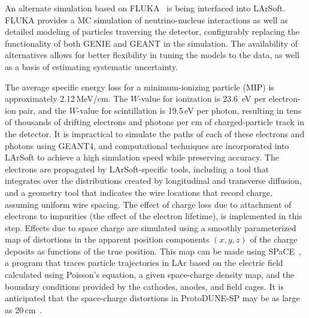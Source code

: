An alternate simulation based on FLUKA~\cite{Fluka15, Ferrari:2005zk, Battistoni:2009zzb} 
is being interfaced into LArSoft.
FLUKA provides a MC simulation of neutrino-nucleus interactions as well as
detailed modeling of particles traversing the detector, configurably replacing the
functionality of both GENIE and GEANT in the simulation.  The availability of alternatives
allows for better flexibility in tuning the models to the data, as well as a basis of
estimating systematic uncertainty.

The average specific energy loss for a minimum-ionizing particle (MIP)
is approximately 2.12\,MeV/cm.  The $W$-value for ionization is 23.6~eV
per electron-ion pair, and the $W$-value for scintillation is 19.5\,eV
per photon, resulting in tens of thousands of drifting electrons and
photons per cm of charged-particle track in the detector.  It is
impractical to simulate the paths of each of these electrons and 
photons using GEANT4, and  computational techniques are incorporated
into LArSoft to achieve a high simulation speed while preserving
accuracy.  The electrons are propagated by LArSoft-specific tools,
including a tool that integrates over the distributions created by longitudinal
and transverse diffusion, 
and a geometry tool that indicates the wire locations that record charge, assuming uniform wire spacing.
The effect of charge loss due to attachment
of electrons to impurities (the effect of the electron lifetime),   is
implemented in this step.  
Effects due to space charge are simulated using a smoothly parameterized
map of
distortions in the apparent position components $(x,y,z)$ of the charge
deposits as
functions of the true position.
This map can be made using SPaCE~\cite{Mooney:2015kke}, a
program that traces particle trajectories in LAr based on the
electric field calculated using Poisson's equation, a given
space-charge density map, and the boundary conditions provided by the
cathodes, anodes, and field cages.  It is anticipated that the
space-charge distortions in ProtoDUNE-SP may be as large as
20\,cm~\cite{Mooney:2015kke}. 



